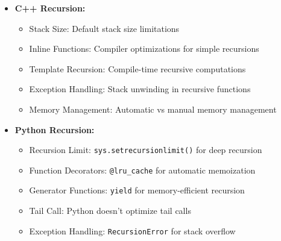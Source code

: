 \documentclass[a4paper,10pt]{book}
\begin{document}
\begin{itemize}[leftmargin=*]
    \item \textbf{C++ Recursion:}
    \begin{itemize}
        \item Stack Size: Default stack size limitations
        \item Inline Functions: Compiler optimizations for simple recursions
        \item Template Recursion: Compile-time recursive computations
        \item Exception Handling: Stack unwinding in recursive functions
        \item Memory Management: Automatic vs manual memory management
    \end{itemize}

    \item \textbf{Python Recursion:}
    \begin{itemize}
        \item Recursion Limit: \texttt{sys.setrecursionlimit()} for deep recursion
        \item Function Decorators: \texttt{@lru\_cache} for automatic memoization
        \item Generator Functions: \texttt{yield} for memory-efficient recursion
        \item Tail Call: Python doesn't optimize tail calls
        \item Exception Handling: \texttt{RecursionError} for stack overflow
    \end{itemize}
\end{itemize}
\end{document}
